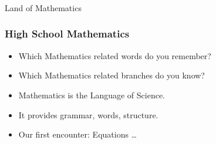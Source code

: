 \begin{frame}[fragile]\frametitle{}
\begin{center}
{\Large Land of Mathematics}
\end{center}
\end{frame}

 \begin{frame}[fragile]\frametitle{High School Mathematics}
\begin{itemize}
\item Which Mathematics related words do you remember?
\item Which Mathematics related branches do you know?
\item Mathematics is the Language of Science.
\item It provides grammar, words, structure.
\item Our first encounter: Equations \ldots
\end{itemize}
\end{frame}

